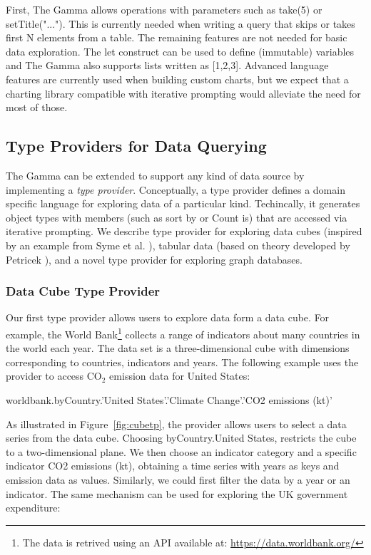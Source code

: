 \documentclass[manuscript,review,anonymous]{acmart}
\newcommand{\ikvd}[1]{{\fontfamily{zi4}\selectfont\small #1}}
\begin{document}
\noindent
First, The Gamma allows operations with parameters such as \ikvd{take(5)} or \ikvd{setTitle("...")}.
This is currently needed when writing a query that skips or takes first N elements from a table.
The remaining features are not needed for basic data exploration. The \ikvd{let} construct can be
used to define (immutable) variables and The Gamma also supports lists written as \ikvd{[1,2,3]}.
Advanced language features are currently used when building custom charts, but we expect that a
charting library compatible with iterative prompting would alleviate the need for most of those.


\subsection{Type Providers for Data Querying}
\label{sec:overview-tps}

The Gamma can be extended to support any kind of data source by implementing a \emph{type provider}.
Conceptually, a type provider defines a domain specific language for exploring data of a particular
kind. Techincally, it generates object types with members (such as \ikvd{sort by} or \ikvd{Count is})
that are accessed via iterative prompting. We describe type provider for exploring data cubes
(inspired by an example from Syme et al. \cite{inforich}), tabular data (based on theory developed
by Petricek \cite{dotdriven}), and a novel type provider for exploring graph databases.

\subsubsection*{Data Cube Type Provider}
Our first type provider allows users to explore data form a data cube. For example, the World
Bank\footnote{The data is retrived using an API available at: \url{https://data.worldbank.org/}}
collects a range of indicators about many countries in the world each year. The data set is a
three-dimensional cube with dimensions corresponding to countries, indicators and years. The
following example uses the provider to access CO$_{2}$ emission data for United States:

\begin{thegamma}
worldbank.byCountry.'United States'.'Climate Change'.'CO2 emissions (kt)'
\end{thegamma}

\noindent
As illustrated in Figure~\ref{fig:cubetp}, the provider allows users to select a data series
from the data cube. Choosing \ikvd{byCountry.\textquotesingle United States\textquotesingle},
restricts the cube to a two-dimensional plane. We then choose an indicator category
and a specific indicator \ikvd{\textquotesingle CO2 emissions (kt)\textquotesingle}, obtaining
a time series with years as keys and emission data as values. Similarly, we could first filter the
data by a year or an indicator. The same mechanism can be used for exploring the UK government
expenditure:
\end{document}
